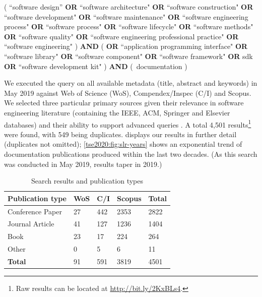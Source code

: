 \begin{framed}
\noindent
\parbox{\linewidth}{
\scriptsize
( ``software design'' \textbf{OR} ``software architecture" \textbf{OR} ``software construction" \textbf{OR} ``software development" \textbf{OR} ``software maintenance" \textbf{OR} ``software engineering process" \textbf{OR} ``software process" \textbf{OR} ``software lifecycle" \textbf{OR} ``software methods" \textbf{OR} ``software quality" \textbf{OR} ``software engineering professional practice" \textbf{OR} ``software engineering" ) \textbf{AND} (  \textbf{OR} ``application programming interface" \textbf{OR} ``software library" \textbf{OR} ``software component" \textbf{OR} ``software framework" \textbf{OR} sdk \textbf{OR} ``software development kit" ) \textbf{AND} (~documentation )
}
\end{framed}

We executed the query on all available metadata (title, abstract and keywords) in May 2019 against Web of Science  (WoS), Compendex/Inspec (C/I) and Scopus. We selected three particular primary sources given their relevance in software engineering literature (containing the IEEE, ACM, Springer and Elsevier databases) and their ability to support advanced queries \citep{Brereton:2007by,Kitchenham:2007dd}. A total 4,501 results\footnote{Raw results can be located at \url{http://bit.ly/2KxBLs4}.} were found, with 549 being duplicates.  displays our results in further detail (duplicates not omitted); \cref{tse2020:fig:slr-years} shows an exponential trend of  documentation publications produced within the last two decades. (As this search was conducted in May 2019, results taper in 2019.)

\begin{table}[tb]
  \caption[Summary of search results in API documentation]{Search results and publication types}
  \label{tse2020:tab:search-results}
  \centering
  \begin{tabular}{l|lll|l}
    \toprule
    \textbf{Publication type} &
    \textbf{WoS} &
    \textbf{C/I} &
    \textbf{Scopus} &
    \textbf{Total} \\
    \midrule
    Conference Paper & 27 & 442 & 2353 & 2822 \\
    Journal Article & 41 & 127 & 1236 & 1404\\
    Book & 23 & 17 & 224 & 264\\
    Other & 0 & 5 & 6 & 11\\
    \midrule
    \textbf{Total} & 91 & 591 & 3819 & 4501\\
    \bottomrule
  \end{tabular}
\end{table}

